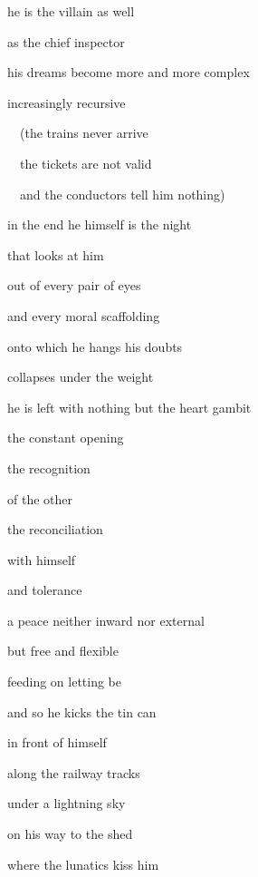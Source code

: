 he is the villain as well

as the chief inspector


\bigskip

his dreams become more and more complex

increasingly recursive


\bigskip

\ \ (the trains never arrive

\ \ the tickets are not valid

\ \  and the conductors tell him nothing)


\bigskip


\bigskip


\bigskip

in the end he himself is the night

that looks at him

out of every pair of eyes


\bigskip

and every moral scaffolding

onto which he hangs his doubts

collapses under the weight


\bigskip


\bigskip

he is left with nothing but the heart gambit


\bigskip

the constant opening

the recognition

of the other

the reconciliation

with himself

and tolerance


\bigskip

a peace neither inward nor external

but free and flexible

feeding on letting be


\bigskip


\bigskip


\bigskip

and so he kicks the tin can

in front of himself

along the railway tracks

under a lightning sky

on his way to the shed


\bigskip

where the lunatics kiss him

